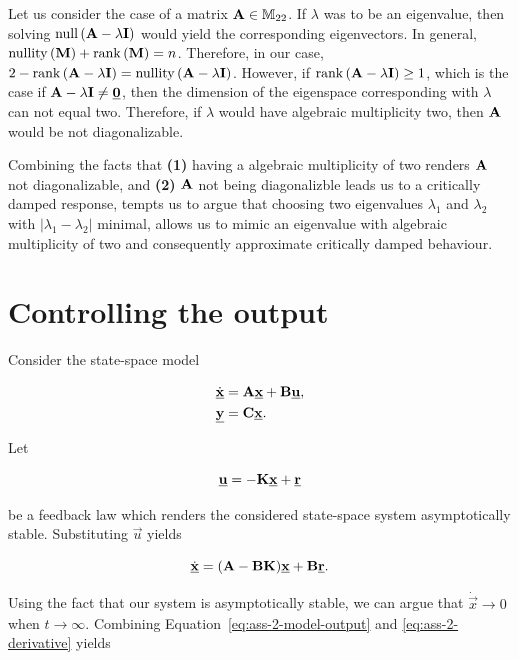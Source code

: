 \documentclass[11pt,titlepage]{report}
\begin{document}
Let us consider the case of a matrix $\mathbf{A} \in \mathbb{M}_{22}$. If $\lambda$ was to be an eigenvalue, then solving $\operatorname{null}{(\mathbf{A} - \lambda \mathbf{I})}$ would yield the corresponding eigenvectors. In general, $\operatorname{nullity}{(\mathbf{M})} + \operatorname{rank}{(\mathbf{M})} = n$. Therefore, in our case, $2 - \operatorname{rank}{(\mathbf{A} - \lambda \mathbf{I})} = \operatorname{nullity}{(\mathbf{A} - \lambda \mathbf{I})}$. However, if $\operatorname{rank}{(\mathbf{A} - \lambda \mathbf{I})} \ge 1$, which is the case if $\mathbf{A} - \lambda \mathbf{I} \neq \mathbf{\underline{0}}$, then the dimension of the eigenspace corresponding with $\lambda$ can not equal two. Therefore, if $\lambda$ would have algebraic multiplicity two, then $\mathbf{A}$ would be not diagonalizable.

Combining the facts that \textbf{(1)} having a algebraic multiplicity of two renders $\mathbf{A}$ not diagonalizable, and \textbf{(2)} $\mathbf{A}$ not being diagonalizble leads us to a critically damped response, tempts us to argue that choosing two eigenvalues $\lambda_1$ and $\lambda_2$ with $|\lambda_1- \lambda_2|$ minimal, allows us to mimic an eigenvalue with algebraic multiplicity of two and consequently approximate critically damped behaviour. 

\section{Controlling the output}
Consider the state-space model

\begin{align}
	\dot{\mathbf{\underline{x}}} &= \mathbf{A}\mathbf{\underline{x}} + \mathbf{B}\mathbf{\underline{u}}, \\
	\mathbf{\underline{y}} &= \mathbf{C} \mathbf{\underline{x}}. \label{eq:ass-2-model-output}
\end{align}

Let

\begin{equation}
	\mathbf{\underline{u}} = -\mathbf{K}\mathbf{\underline{x}} + \mathbf{\underline{r}}
\end{equation}

be a feedback law which renders the considered state-space system asymptotically stable. Substituting $\vec{u}$ yields

\begin{equation} \label{eq:ass-2-derivative}
	\dot{\mathbf{\underline{x}}} = (\mathbf{A} - \mathbf{B} \mathbf{K}) \mathbf{\underline{x}} + \mathbf{B} \mathbf{\underline{r}}.
\end{equation}

Using the fact that our system is asymptotically stable, we can argue that $\dot{\vec{x}} \to 0$ when $t \to \infty$. Combining Equation~\ref{eq:ass-2-model-output} and \ref{eq:ass-2-derivative} yields
\end{document}
